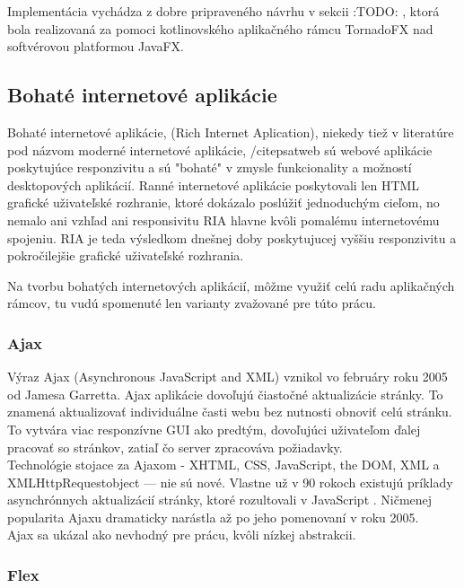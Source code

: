 Implementácia vychádza z dobre pripraveného návrhu v sekcii :TODO: , ktorá bola realizovaná za pomoci kotlinovského aplikačného rámcu TornadoFX nad softvérovou platformou JavaFX.

\subsection{Bohaté internetové aplikácie}

Bohaté internetové aplikácie, (Rich Internet Aplication), niekedy tiež v literatúre pod názvom moderné internetové aplikácie, /cite{psatweb} sú webové aplikácie poskytujúce responzivitu a sú "bohaté" v zmysle funkcionality a možností desktopových aplikácií. Ranné internetové aplikácie poskytovali len HTML grafické uživateľské rozhranie, ktoré dokázalo poslúžiť jednoduchým cieľom, no nemalo ani vzhľad ani responsivitu RIA hlavne kvôli pomalému internetovému spojeniu. RIA je teda výsledkom dnešnej doby poskytujucej vyššiu responzivitu a pokročilejšie grafické uživateľské rozhrania.
\cite{deitel2008ajax}

Na tvorbu bohatých internetových aplikácií, môžme využiť celú radu aplikačných rámcov, tu vudú spomenuté len varianty zvažované pre túto prácu.

\subsubsection{Ajax}

Výraz Ajax (Asynchronous JavaScript and XML) vznikol vo februáry roku 2005 od Jamesa Garretta. Ajax aplikácie dovoľujú čiastočné aktualizácie stránky. To znamená aktualizovať individuálne časti webu bez nutnosti obnoviť celú stránku. To vytvára viac responzívne GUI ako predtým, dovoľujúci uživateľom ďalej pracovať so stránkov, zatiaľ čo server zpracováva požiadavky. \\

Technológie stojace za Ajaxom - XHTML, CSS, JavaScript, the DOM, XML a XMLHttpRequestobject — nie sú nové. Vlastne už v 90 rokoch existujú príklady asynchrónnych aktualizácií stránky, ktoré rozultovali v JavaScript \cite{deitel2008ajax}. Ničmenej popularita Ajaxu dramaticky narástla až po jeho pomenovaní v roku 2005. \\

Ajax sa ukázal ako nevhodný pre prácu, kvôli nízkej abstrakcii.

\subsubsection{Flex}

